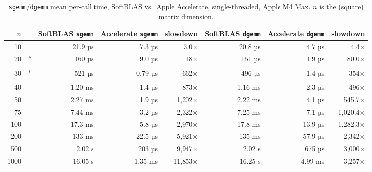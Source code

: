\documentclass[twoside]{article}
\begin{document}
\begin{table}
\centering
\caption{\texttt{sgemm}/\texttt{dgemm} mean per-call time, SoftBLAS vs.\ Apple Accelerate, single-threaded, Apple M4 Max.  $n$ is the (square) matrix dimension.}
\label{tab:price}
\begin{tabular}{r@{}lrrr|rrr}
\toprule
$n$ & & SoftBLAS \texttt{sgemm} & Accelerate \texttt{sgemm} & slowdown & SoftBLAS \texttt{dgemm} & Accelerate \texttt{dgemm} & slowdown \\
\midrule
10  & {} & 21.9 µs  & 7.3 µs   & 3.0×      & 20.8 µs  & 4.7 µs   & 4.4×  \\
20 & \textsuperscript{*}   & 160 µs   & 9.0 µs   & 18×     & 151 µs   & 1.9 µs   & 80.0× \\
30 & \textsuperscript{*}   & 521 µs   & 0.79 µs  & 662×    & 496 µs & 1.4 µs   & 354× \\
40 & {} & 1.20 ms  & 1.4 µs   & 873×    & 1.16 ms  & 2.3 µs   & 496× \\
50 & {} & 2.27 ms  & 1.9 µs   & 1,202×   & 2.22 ms  & 4.1 µs   & 545.7× \\
75 & {} & 7.44 ms  & 3.2 µs   & 2,322×   & 7.25 ms  & 7.1 µs   & 1,020.4× \\
100 & {} & 17.3 ms  & 5.8 µs   & 2,970×   & 17.8 ms  & 13.9 µs  & 1,282.3× \\
200 & {} & 133 ms   & 22.5 µs  & 5,921×   & 135 ms   & 57.9 µs  & 2,342× \\
500  & {} & 2.02 s   & 203 µs   & 9,947×   & 2.02 s   & 675 µs   & 3,000× \\
1000 & {} & 16.05 s  & 1.35 ms  & 11,853×  & 16.25 s  & 4.99 ms  & 3,257× \\
\bottomrule
\end{tabular}
\end{table}
\end{document}

